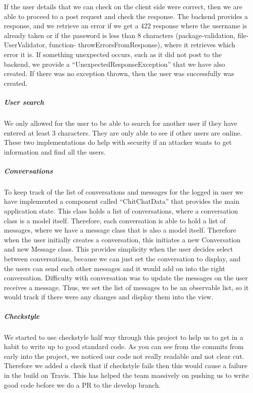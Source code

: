 \documentclass[11pt,a4paper]{report}
\begin{document}
If the user details that we can check on the client side were correct, then we are able to proceed to a post request and check the response. The backend provides a response, and we retrieve an error if we get a 422 response where the username is already taken or if the password is less than 8 characters (package-validation, file-UserValidator, function- throwErrorsFromResponse), where it retrieves which error it is. If something unexpected occurs, such as it did not post to the backend, we provide a “UnexpectedResponseException” that we have also created. If there was no exception thrown, then the user was successfully was created.

\subparagraph{User search}
We only allowed for the user to be able to search for another user if they have entered at least 3 characters. They are only able to see if other users are online. These two implementations do help with security if an attacker wants to get information and find all the users.

\subparagraph{Conversations}
To keep track of the list of conversations and messages for the logged in user we have implemented a component called “ChitChatData” that provides the main application state. This class holds a list of conversations, where a conversation class is a model itself. Therefore, each conversation is able to hold a list of messages, where we have a message class that is also a model itself. Therefore when the user initially creates a conversation, this initiates a new Conversation and new Message class. This provides simplicity when the user decides select between conversations, because we can just set the conversation to display, and the users can send each other messages and it would add on into the right conversation. Difficulty with conversation was to update the messages on the user receives a message. Thus, we set the list of messages to be an observable list, so it would track if there were any changes and display them into the view.

\subparagraph{Checkstyle}
We started to use checkstyle half way through this project to help us to get in a habit to write up to good standard code. As you can see from the commits from early into the project, we noticed our code not really readable and not clear cut. Therefore we added a check that if checkstyle fails then this would cause a failure in the build on Travis. This has helped the team massively on pushing us to write good code before we do a PR to the develop branch.
\end{document}

